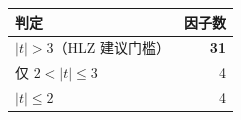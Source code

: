 \begin{tabular}{@{}lr@{}}
\toprule
判定 & 因子数 \\
\midrule
$|t|>3$（HLZ 建议门槛） & \textbf{31} \\
仅 $2<|t|\le 3$ & 4 \\
$|t|\le 2$ & 4 \\
\bottomrule
\end{tabular}
